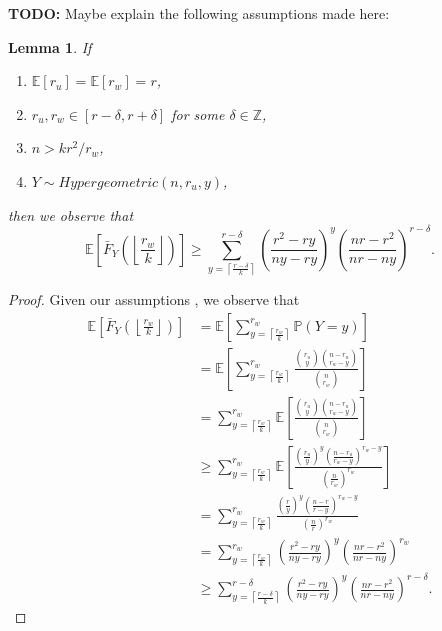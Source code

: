 \documentclass[10pt]{extarticle}
\newcommand{\Z}{\mathbb{Z}}
\newtheorem{lemma}[theorem]{Lemma}
\theoremstyle{definition}
\begin{document}
\textbf{TODO:} Maybe explain the following assumptions made here:   
\begin{lemma}
    \label{lemma:tail-expectation}
        If \begin{enumerate}
            \item $\mathbb{E}[r_u] = \mathbb{E}[r_w] = r$,
            \item $r_u, r_w \in [r-\delta,r+\delta]$ for some $\delta \in \Z$,
            \item $n > kr^2/r_w$,
            \item $Y \sim Hypergeometric(n, r_u, y)$,
        \end{enumerate}      
then we observe that $$\mathbb{E} \left[ \bar{F}_Y\left(\left\lfloor \frac{r_w}{k} \right\rfloor\right) \right] \ge \sum_{y = \left\lceil \frac{r-\delta}{k} \right\rceil}^{r-\delta}
        \left(\frac{r^2 - ry}{ny-ry}\right)^{y} \left(\frac{nr-r^2}{nr-ny}\right)^{r-\delta}.$$
    \end{lemma}
    \begin{proof}
        Given our assumptions , we observe that
        \begin{equation}
        \begin{split}
            \mathbb{E} \left[\bar{F}_Y\left(\left\lfloor \frac{r_w}{k} \right\rfloor\right) \right] &=
            \mathbb{E} \left[ \sum_{y = \left\lceil \frac{r_w}{k} \right\rceil}^{r_w} \mathbb{P}(Y=y) \right] \\ &= \mathbb{E}  \left[ \sum_{y = \left\lceil \frac{r_w}{k} \right\rceil}^{r_w} \frac{\binom{r_u}{y} \binom{n-r_u}{r_w-y}}{\binom{n}{r_w}} \right] \\ &=  \sum_{y = \left\lceil \frac{r_w}{k} \right\rceil}^{r_w} \mathbb{E} \left[\frac{\binom{r_u}{y} \binom{n-r_u}{r_w-y}}{\binom{n}{r_w}}  \right] \\ &\ge \sum_{y = \left\lceil \frac{r_w}{k} \right\rceil}^{r_w} \mathbb{E} 
            \left[
                \frac
                {
                    \left(\frac{r_u}{y}\right)^{y} \left(\frac{n-r_u}{r_w - y}\right)^{r_w-y}
                }
                {
                    \left(\frac{n}{r_w}\right)^{r_w}
                }  
            \right] \\ &= 
            \sum_{y = \left\lceil \frac{r_w}{k} \right\rceil}^{r_w}
                \frac
                {
                    \left(\frac{r}{y}\right)^{y} \left(\frac{n-r}{r - y}\right)^{r_w-y}
                }
                {
                    \left(\frac{n}{r}\right)^{r_w}
                } 
                \\ &=
                \sum_{y = \left\lceil \frac{r_w}{k} \right\rceil}^{r_w}
                    \left(\frac{r^2 - ry}{ny-ry}\right)^{y} \left(\frac{nr-r^2}{nr-ny}\right)^{r_w}
                \\ &\ge
                \sum_{y = \left\lceil \frac{r-\delta}{k} \right\rceil}^{r-\delta}
                    \left(\frac{r^2 - ry}{ny-ry}\right)^{y} \left(\frac{nr-r^2}{nr-ny}\right)^{r-\delta}.
        \end{split}
    \end{equation}
    \end{proof}
\end{document}
